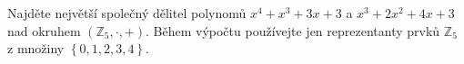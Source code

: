 \subsubsection{}
Najděte největší společný dělitel polynomů $x^{4}+x^{3}+3x+3$ a
$x^{3}+2x^{2}+4x+3$ nad okruhem $\left ( \mathbb{Z}_{5},\cdot ,+ \right )$.
Během výpočtu používejte jen reprezentanty prvků $\mathbb{Z}_{5}$ z množiny
$\left \{ 0,1,2,3,4 \right \}$.
